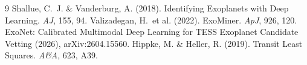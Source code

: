 \documentclass[11pt]{article}
\begin{document}
\begin{thebibliography}{9}
 Shallue, C.~J. \& Vanderburg, A. (2018). Identifying
Exoplanets with Deep Learning. \emph{AJ}, 155, 94.
 Valizadegan, H.\ et al. (2022). ExoMiner. \emph{ApJ}, 926, 120.
 ExoNet: Calibrated Multimodal Deep Learning for TESS
Exoplanet Candidate Vetting (2026), arXiv:2604.15560.
 Hippke, M. \& Heller, R. (2019). Transit Least Squares.
\emph{A\&A}, 623, A39.
\end{thebibliography}
\end{document}
